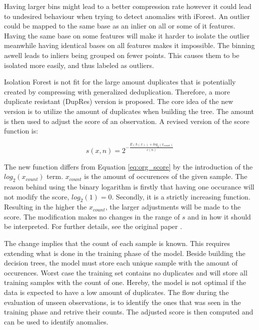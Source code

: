 Having larger bins might lead to a better compression rate however it could lead to undesired behaviour when trying to detect anomalies with iForest. An outlier could be mapped to the same base as an inlier on all or some of it features. Having the same base on some features will make it harder to isolate the outlier meanwhile having identical bases on all features makes it impossible. The binning aswell leads to inliers being grouped on fewer points. This causes them to be isolated more easily, and thus labeled as outliers.   

Isolation Forest is not fit for the large amount duplicates that is potentially created by compressing with generalized deduplication. Therefore, a more duplicate resistant (DupRes) version is proposed. The core idea of the new version is to utilize the amount of duplicates when building the tree. The amount is then used to adjust the score of an observation. A revised version of the score function is: 

\begin{equation}
  s(x,n) = 2^{-\frac{E(h(x))+log_2(x_{count})}{c(n)}}
  \label{eq:dupres_score}
\end{equation}     
 
The new function differs from Equation \ref{eq:org_score} by the introduction of the $log_2(x_{count})$ term. $x_{count}$ is the amount of occurences of the given sample. The reason behind using the binary logarithm is firstly that having one occurance will not modify the score, $log_2(1)=0$. Secondly, it is a strictly increasing function. Resulting in the higher the $x_{count}$, the larger adjustments will be made to the score. The modification makes no changes in the range of $s$ and in how it should be interpreted. For further details, see the original paper \cite{iforest}.     

The change implies that the count of each sample is known. This requires extending what is done in the training phase of the model. Beside building the decision trees, the model must store each unique sample with the amount of occurences. Worst case the training set contains no duplicates and will store all training samples with the count of one. Hereby, the model is not optimal if the data is expected to have a low amount of duplicates. The flow during the evaluation of unseen observations, is to identify the ones that was seen in the training phase and retrive their counts. The adjusted score is then computed and can be used to identify anomalies.        

% 
